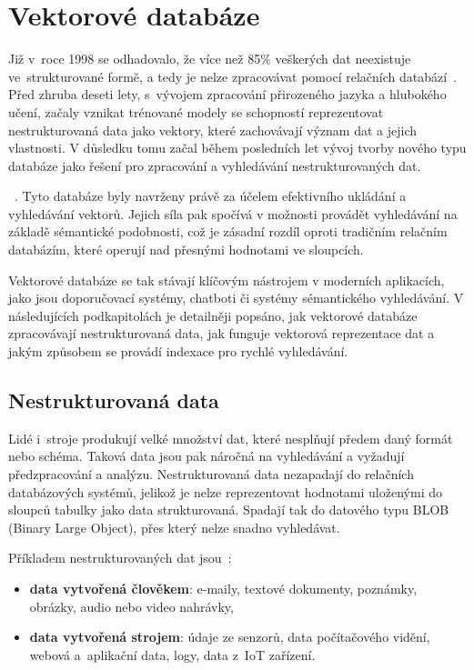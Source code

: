 \chapter{Vektorové databáze}
\label{vdb}

Již v~roce 1998 se odhadovalo, že více než 85\% veškerých dat neexistuje ve~strukturované formě, a tedy je nelze zpracovávat pomocí relačních databází~\cite{blumberg2003_unstructured_data}. Před zhruba deseti lety, s~vývojem zpracování přirozeného jazyka a hlubokého učení, začaly vznikat trénované modely se schopností reprezentovat nestrukturovaná data jako vektory, které zachovávají význam dat a jejich vlastnosti. V důsledku tomu začal během posledních let vývoj tvorby nového typu databáze jako řešení pro zpracování a vyhledávání nestrukturovaných dat.

~\cite{han2023_vector_database}. Tyto databáze byly navrženy právě za účelem efektivního ukládání a vyhledávání vektorů. Jejich síla pak spočívá v možnosti provádět vyhledávání na základě sémantické podobnosti, což je zásadní rozdíl oproti tradičním relačním databázím, které operují nad přesnými hodnotami ve sloupcích.

Vektorové databáze se tak stávají klíčovým nástrojem v moderních aplikacích, jako jsou doporučovací systémy, chatboti či systémy sémantického vyhledávání. V následujících podkapitolách je detailněji popsáno, jak vektorové databáze zpracovávají nestrukturovaná data, jak funguje vektorová reprezentace dat a jakým způsobem se provádí indexace pro rychlé vyhledávání.

\section{Nestrukturovaná data}
Lidé i~stroje produkují velké množství dat, které nesplňují předem daný formát nebo schéma. Taková data jsou pak náročná na vyhledávání a vyžadují předzpracování a analýzu. Nestrukturovaná data nezapadají do relačních databázových systémů, jelikož je nelze reprezentovat hodnotami uloženými do sloupců tabulky jako data strukturovaná. Spadají tak do datového typu BLOB (Binary Large Object), přes který nelze snadno vyhledávat. 

Příkladem nestrukturovaných dat jsou~\cite{zilliz2022_unstructured_data}:
\begin{itemize}
    \item \textbf{data vytvořená člověkem}: e-maily, textové dokumenty, poznámky, obrázky, audio nebo video nahrávky,
    \item \textbf{data vytvořená strojem}: údaje ze senzorů, data počítačového vidění, webová a~aplikační data, logy, data z~IoT zařízení.
\end{itemize} 

